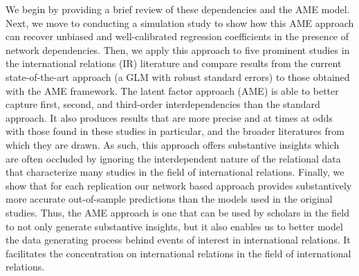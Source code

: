 We begin by providing a brief review of these dependencies and the AME model. Next, we move to conducting a simulation study to show how this AME approach can recover unbiased and well-calibrated regression coefficients in the presence of network dependencies. Then, we apply this approach to five prominent studies in the international relations (IR) literature and compare results from the current state-of-the-art approach (a GLM with robust standard errors) to those obtained with the AME framework. The latent factor approach (AME) is able to better capture first, second, and third-order interdependencies than the standard approach. It also produces results that are more precise and at times at odds with those found in these studies in particular, and the broader literatures from which they are drawn. As such, this approach offers substantive insights which are often occluded by ignoring the interdependent nature of the relational data that characterize many studies in the field of international relations. Finally, we show that for each replication our network based approach provides substantively more accurate out-of-sample predictions than the models used in the original studies. Thus, the AME approach is one that can be used by scholars in the field to not only generate substantive insights, but it also enables us to better model the data generating process behind events of interest in international relations.  It facilitates the concentration on international relations in the field of international relations.